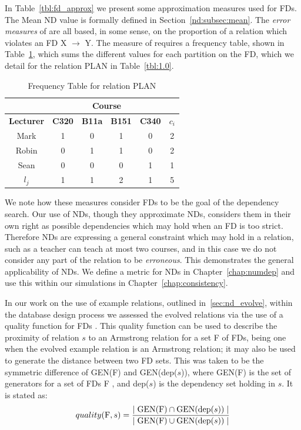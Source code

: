In Table~\ref{tbl:fd_approx} we present some approximation measures
used for FDs. The Mean ND value is formally defined in
Section~\ref{nd:subsec:mean}. 
The {\em error measures} of 
\cite{km95}
are all based, in some sense, on the proportion of a relation which
violates an FD X $\to$ Y. The measure of \cite{psm93} requires a
frequency table, shown in Table~\ref{tab:fd_rel1}, which sums the
different values for each partition on the FD, which we detail for the
relation PLAN in 
Table~\ref{tbl:1.0}.


{\line
\begin{table}[ht]
\begin{center}
{\small
\begin{tabular}{||c|cccc|c||} \hline 
	& \multicolumn{4}{|c|}{\bf Course } &  \\ \hline
 {\bf Lecturer} & {\bf C320} & {\bf B11a} & {\bf B151} & {\bf C340} & $c_i$ \\ \hline
Mark		&	1    &	0 	  &	1 	&	0   & 2	\\
Robin		&	0    &	1 	  &	1 	&	0   & 2	\\
Sean		&	0    &	0 	  &	0 	&	1   & 1	\\ \hline
$l_j$		&    1	     &	1	  &	2	&	1   & 5	\\ \hline
\end{tabular}
}
\end{center}
\caption{\label{tab:fd_rel1}Frequency Table for relation PLAN}
\end{table}
}
 

We note how these measures consider FDs to be the goal of the
dependency search. Our use of NDs, though they approximate NDs,
considers them in their own right as possible dependencies which may
hold when an FD is too strict. Therefore NDs are expressing a general
constraint which may hold in a relation, such as a teacher can teach
at most two courses, and in this case we do not consider any part
of the relation to be {\em erroneous}. This demonstrates the general
applicability of NDs.
We define a metric for NDs in
 Chapter~\ref{chap:numdep} and use this within our simulations in
 Chapter~\ref{chap:consistency}. 

\smallskip
In our
work on the use of example relations, outlined
 in~\ref{sec:nd_evolve}, within the database 
design process we assessed the evolved relations via the use
of a quality function for FDs \cite{cl96}. This quality function can
be used to describe the proximity of relation $s$ to an Armstrong relation for a set F of FDs, being one when the evolved 
example relation is an Armstrong relation; it may also be used to
generate the distance between two FD sets. This was taken to be the
 symmetric difference of GEN(F) and GEN(dep($s$)), where
GEN(F) is the set of generators for a set of FDs F \cite{mr86}, and
dep($s$) is the dependency set holding in $s$. It is stated as:
\begin{equation}\label{eq:quality}
quality({\rm F}, s) = \frac{\mid {\rm GEN(F)} \cap {\rm GEN}({\rm dep}(s))
\mid}{\mid {\rm GEN}({\rm F}) \cup {\rm GEN}({\rm dep}(s))\mid }
\end{equation}

